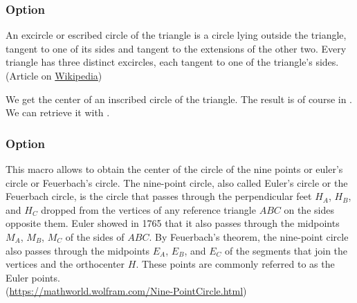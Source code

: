 \begin{tkzexample}[latex=7cm,small]
\end{tkzexample}

\subsubsection{Option }
An excircle or escribed circle of the triangle is a circle lying outside the triangle, tangent to one of its sides and tangent to the extensions of the other two. Every triangle has three distinct excircles, each tangent to one of the triangle's sides.\\
(Article on \href{https://en.wikipedia.org/wiki/Incircle_and_excircles_of_a_triangle}{Wikipedia})


 We get the center of an inscribed circle of the triangle. The result is of course in . We can retrieve it with .

\begin{tkzexample}[latex=7cm,small]
\end{tkzexample}

\subsubsection{Option }
This macro allows to obtain the center of the circle of the nine points or euler's circle or Feuerbach's circle. The nine-point circle, also called Euler's circle or the Feuerbach circle, is the circle that passes through the perpendicular feet $H_A$, $H_B$, and $H_C$ dropped from the vertices of any reference triangle $ABC$ on the sides opposite them. Euler showed in 1765 that it also passes through the midpoints $M_A$, $M_B$, $M_C$ of the sides of $ABC$. By Feuerbach's theorem, the nine-point circle also passes through the midpoints $E_A$, $E_B$, and $E_C$ of the segments that join the vertices and the orthocenter $H$. These points are commonly referred to as the Euler points.\\ (\url{https://mathworld.wolfram.com/Nine-PointCircle.html})

